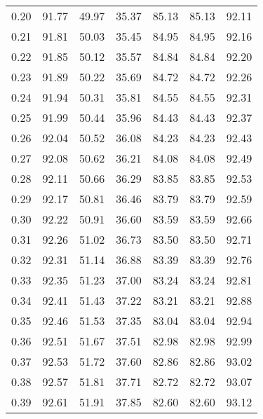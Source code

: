 \begin{tabular}{|c|c|c|c|c|c|c|}
      0.20 &     91.77 &     49.97 &      35.37 &   85.13 &      85.13 &         92.11 \\
      0.21 &     91.81 &     50.03 &      35.45 &   84.95 &      84.95 &         92.16 \\
      0.22 &     91.85 &     50.12 &      35.57 &   84.84 &      84.84 &         92.20 \\
      0.23 &     91.89 &     50.22 &      35.69 &   84.72 &      84.72 &         92.26 \\
      0.24 &     91.94 &     50.31 &      35.81 &   84.55 &      84.55 &         92.31 \\
      0.25 &     91.99 &     50.44 &      35.96 &   84.43 &      84.43 &         92.37 \\
      0.26 &     92.04 &     50.52 &      36.08 &   84.23 &      84.23 &         92.43 \\
      0.27 &     92.08 &     50.62 &      36.21 &   84.08 &      84.08 &         92.49 \\
      0.28 &     92.11 &     50.66 &      36.29 &   83.85 &      83.85 &         92.53 \\
      0.29 &     92.17 &     50.81 &      36.46 &   83.79 &      83.79 &         92.59 \\
      0.30 &     92.22 &     50.91 &      36.60 &   83.59 &      83.59 &         92.66 \\
      0.31 &     92.26 &     51.02 &      36.73 &   83.50 &      83.50 &         92.71 \\
      0.32 &     92.31 &     51.14 &      36.88 &   83.39 &      83.39 &         92.76 \\
      0.33 &     92.35 &     51.23 &      37.00 &   83.24 &      83.24 &         92.81 \\
      0.34 &     92.41 &     51.43 &      37.22 &   83.21 &      83.21 &         92.88 \\
      0.35 &     92.46 &     51.53 &      37.35 &   83.04 &      83.04 &         92.94 \\
      0.36 &     92.51 &     51.67 &      37.51 &   82.98 &      82.98 &         92.99 \\
      0.37 &     92.53 &     51.72 &      37.60 &   82.86 &      82.86 &         93.02 \\
      0.38 &     92.57 &     51.81 &      37.71 &   82.72 &      82.72 &         93.07 \\
      0.39 &     92.61 &     51.91 &      37.85 &   82.60 &      82.60 &         93.12 \\

\end{tabular}
